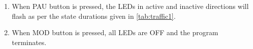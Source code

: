 \begin{enumerate}
\item When PAU button is pressed, the LEDs in active and inactive directions
  will flash as per the state durations given in \autoref{tab:traffic1}.
\item When MOD button is pressed, all LEDs are OFF and the program terminates.
\end{enumerate}
 

